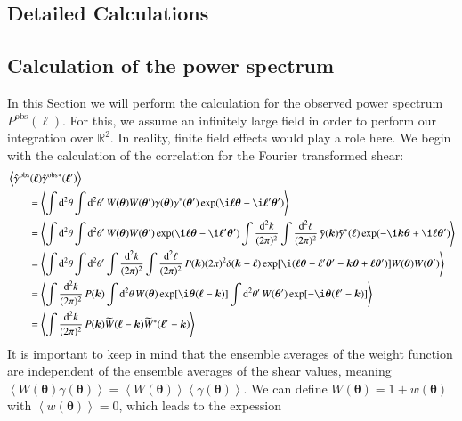 \documentclass[referee]{aa} %
\renewcommand{\[}{\begin{equation}}
\renewcommand{\]}{\end{equation}}
\def\b#1{\bm{#1}}
\def\la{\left<}
\def\ra{\right>}
\def\gammaoh{\hat{\gamma}^{\text{obs}}}
\begin{document}


\begin{appendix}
\section{Detailed Calculations}
\subsection{Calculation of the power spectrum}
In this Section we will perform the calculation for the observed power spectrum $P^{\text{obs}}(\b \ell)$. For this, we assume an infinitely large field in order to perform our integration over $\mathbb{R}^2$. In reality, finite field effects would play a role here. We begin with the calculation of the correlation for the Fourier transformed shear:
\begin{align}
& \la \gammaoh(\b \ell) \gammaoh {}^*(\b \ell')\ra\nonumber\\
 &\qquad = \la\int\text{d}^2 \theta\int\text{d}^2 \theta'\,W(\b \theta)W(\b \theta')\gamma(\b \theta)\gamma^*(\b \theta')\exp(\i \b \ell\b \theta-\i \b \ell'\b \theta')\ra\nonumber\\
 &\qquad = \la\int\text{d}^2 \theta\int\text{d}^2 \theta'\,W(\b \theta)W(\b \theta')\exp(\i \b \ell\b \theta-\i \b \ell'\b \theta') \int \frac{\text{d}^2 k}{(2\pi)^2}\int \frac{\text{d}^2 \ell}{(2\pi)^2}\, \tilde{\gamma}(\b k)\tilde{\gamma}^*(\b \ell)\exp(-\i \b k\b \theta+\i \b \ell\b \theta')\ra \nonumber\\
&\qquad = \la \int \text{d}^2 \theta \int \text{d}^2 \theta' \int \frac{\text{d}^2 k}{(2\pi)^2} \int \frac{\text{d}^2 \ell}{(2\pi)^2}\, P(\b k)(2\pi)^2 \delta(\b k-\b \ell) \exp[\i (\b \ell\b \theta-\b \ell'\b \theta'-\b k\b \theta+\b \ell\b \theta')]W(\b \theta)W(\b \theta')\ra \nonumber\\
  &\qquad = \la \int \frac{\text{d}^2 k}{(2\pi)^2} \, P(\b k) \int \text{d}^2 \theta\, W(\b \theta)\exp[\i\b \theta(\b \ell-\b k)]\int \text{d}^2 \theta'\, W(\b \theta') \exp[-\i\b \theta(\b \ell'-\b k)] \ra \nonumber\\
  &\qquad = \la \int\frac{\text{d}^2 k}{(2\pi)^2} \, P(\b k)\widetilde{W}(\b \ell-\b k)\widetilde{W}^* (\b \ell'-\b k)\ra
\end{align}
It is important to keep in mind that the ensemble averages of the weight function are independent of the ensemble averages of the shear values, meaning $\la W(\b \theta)\gamma(\b \theta)\ra = \la W(\b \theta)\ra \la \gamma(\b \theta)\ra$. We can define $W(\b \theta)=1+w(\b\theta)$ with $\la w(\b \theta)\ra = 0$, which leads to the expession

\end{appendix}
\end{document}
